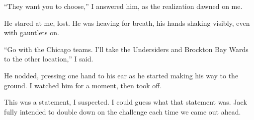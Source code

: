 ``They want you to choose,'' I answered him, as the realization dawned on me.



He stared at me, lost.  He was heaving for breath, his hands shaking visibly, even with gauntlets on.



``Go with the Chicago teams.  I'll take the Undersiders and Brockton Bay Wards to the other location,'' I said.



He nodded, pressing one hand to his ear as he started making his way to the ground.  I watched him for a moment, then took off.



This was a statement, I suspected.  I could guess what that statement was.  Jack fully intended to double down on the challenge each time we came out ahead.





